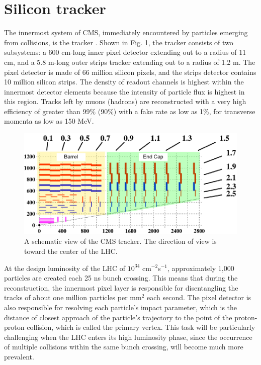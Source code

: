 \section{Silicon tracker}
The innermost system of CMS, immediately encountered by particles emerging from collisions, is the tracker \cite{Veszpremi:2014hpa}. Shown in Fig. \ref{fig:CmsTracker}, the tracker consists of two subsystems: a 600 cm-long inner pixel detector extending out to a radius of 11 cm, and a 5.8 m-long outer strips tracker extending out to a radius of 1.2 m.  The pixel detector is made of 66 million silicon pixels, and the strips detector contains 10 million silicon strips. The density of readout channels is highest within the innermost detector elements because the intensity of particle flux is highest in this region. Tracks left by muons (hadrons) are reconstructed with a very high efficiency of greater than 99\% (90\%) with a fake rate as low as 1\%, for transverse momenta as low as 150 MeV.
\begin{figure}[h]
\centering
\includegraphics[width=0.75\linewidth]{figures/CMS/TrackerLayout.png}
\caption{A schematic view of the CMS tracker. The direction of view is toward the center of the LHC.} 
\label{fig:CmsTracker}
\end{figure}
At the design luminosity of the LHC of $10^{34}$ cm$^{-2}$s$^{-1}$, approximately 1,000 particles are created each 25 ns bunch crossing. This means that during the reconstruction, the innermost pixel layer is responsible for disentangling the tracks of about one million particles per mm$^2$ each second. The pixel detector is also responsible for resolving each particle's impact parameter, which is the distance of closest approach of the particle's trajectory to the point of the proton-proton collision, which is called the primary vertex. This task will be particularly challenging when the LHC enters its high luminosity phase, since the occurrence of multiple collisions within the same bunch crossing, will become much more prevalent. 

